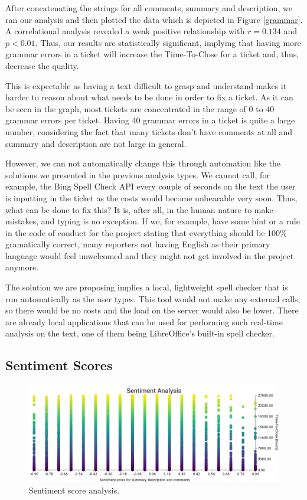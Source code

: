 \documentclass{mpaper}
\begin{document}
After concatenating the strings for all comments, summary and description, we ran our analysis and then plotted the 
data which is depicted in Figure \ref{grammar}. A correlational analysis revealed a weak positive
relationship with $r = 0.134$ and $p < 0.01$. Thus, our results are statistically significant, implying that 
having more grammar errors in a ticket will increase the Time-To-Close for a ticket and, thus, decrease the quality. 

This is expectable as having a text difficult to grasp and understand makes it harder to reason about what needs 
to be done in order to fix a ticket. As it can be seen in the graph, most tickets are concentrated in the range of 
0 to 40 grammar errors per ticket. Having 40 grammar errors in a ticket is quite a large number, considering the fact 
that many tickets don't have comments at all and summary and description are not large in general. 

However, we can not automatically change this through automation like the solutions we presented in the previous 
analysis types. We cannot call, for example, the Bing Spell Check API every couple of seconds on the text the user 
is inputting in the ticket as the costs would become unbearable very soon. Thus, what can be done to fix this? It is, 
after all, in the human nature to make mistakes, and typing is no exception. If we, for example, have some hint or a rule
in the code of conduct for the project stating that everything should be 100\% gramatically correct, many reporters not 
having English as their primary language would feel unwelcomed and they might not get involved in the project anymore. 

The solution we are proposing implies a local, lightweight spell checker that is run automatically as the user types. 
This tool would not make any external calls, so there would be no costs and the load on the server would also be lower. 
There are already local applications that can be used for performing such real-time analysis on the text, one of them 
being LibreOffice's built-in spell checker.

\subsection{Sentiment Scores}

\begin{figure}[ht]
  \begin{center}
    \includegraphics[scale=0.23]{images/sentiment_analysis.png}
  \end{center}
  \caption{\label{sentiment}Sentiment score analysis.}
\end{figure}
\end{document}
